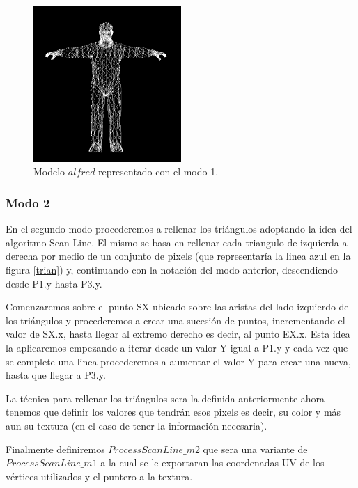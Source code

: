 \documentclass[a4paper]{article}
\newcounter{col}
\begin{document}
\begin{figure}[h]
    \centering
    \includegraphics[width=0.50\textwidth]{Imagenes/modo1.png}
    \caption{Modelo $alfred$ representado con el modo 1.}
    \label{modo1}
\end{figure}
 
\pagebreak


\subsubsection{Modo 2} 


\par En el segundo modo procederemos a rellenar los triángulos adoptando la idea del algoritmo Scan Line. El mismo se basa en rellenar cada triangulo de izquierda a derecha por medio de un conjunto de pixels (que representaría la linea azul en la figura \ref{trian}) y, continuando con la notación del modo anterior, descendiendo desde P1.y hasta P3.y.  
\par Comenzaremos sobre el punto SX ubicado sobre las aristas del lado izquierdo de los triángulos y procederemos a crear una sucesión de puntos, incrementando el valor de SX.x, hasta llegar al extremo derecho es decir, al punto EX.x. Esta idea la aplicaremos empezando a iterar desde un valor Y igual a P1.y y cada vez que se complete una linea procederemos a aumentar el valor Y para crear una nueva, hasta que llegar a P3.y.
\par La técnica para rellenar los triángulos sera la definida anteriormente ahora tenemos que definir los valores que tendrán esos pixels es decir, su color y más aun su textura (en el caso de tener la información necesaria).
\par Finalmente definiremos $ProcessScanLine\_m2$ que sera una variante de $ProcessScanLine\_m1$ a la cual se le exportaran las coordenadas UV de los vértices utilizados y el puntero a la textura.
 
\end{document}
